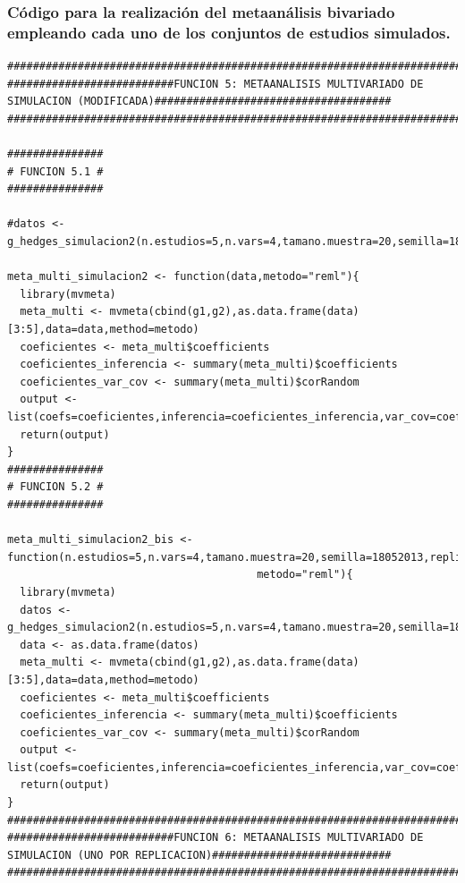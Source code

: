 \documentclass[a4paper,openright,12pt]{report}
\begin{document}
\subsubsection{Código para la realización del metaanálisis bivariado empleando cada uno de los conjuntos de estudios simulados.}
{\tiny
\begin{verbatim}
##############################################################################################################################
##########################FUNCION 5: METAANALISIS MULTIVARIADO DE SIMULACION (MODIFICADA)#####################################
##############################################################################################################################

###############
# FUNCION 5.1 #
###############

#datos <- g_hedges_simulacion2(n.estudios=5,n.vars=4,tamano.muestra=20,semilla=18052013,replicaciones=5,correlacion=0)

meta_multi_simulacion2 <- function(data,metodo="reml"){
  library(mvmeta)
  meta_multi <- mvmeta(cbind(g1,g2),as.data.frame(data)[3:5],data=data,method=metodo)
  coeficientes <- meta_multi$coefficients
  coeficientes_inferencia <- summary(meta_multi)$coefficients
  coeficientes_var_cov <- summary(meta_multi)$corRandom
  output <- list(coefs=coeficientes,inferencia=coeficientes_inferencia,var_cov=coeficientes_var_cov)
  return(output)
}
###############
# FUNCION 5.2 #
###############

meta_multi_simulacion2_bis <- function(n.estudios=5,n.vars=4,tamano.muestra=20,semilla=18052013,replicaciones=5,correlacion=0,
                                       metodo="reml"){
  library(mvmeta)
  datos <- g_hedges_simulacion2(n.estudios=5,n.vars=4,tamano.muestra=20,semilla=18052013,replicaciones=5,correlacion=0)
  data <- as.data.frame(datos)
  meta_multi <- mvmeta(cbind(g1,g2),as.data.frame(data)[3:5],data=data,method=metodo)
  coeficientes <- meta_multi$coefficients
  coeficientes_inferencia <- summary(meta_multi)$coefficients
  coeficientes_var_cov <- summary(meta_multi)$corRandom
  output <- list(coefs=coeficientes,inferencia=coeficientes_inferencia,var_cov=coeficientes_var_cov)
  return(output)  
}
##############################################################################################################################
##########################FUNCION 6: METAANALISIS MULTIVARIADO DE SIMULACION (UNO POR REPLICACION)############################
##############################################################################################################################


\end{verbatim}}
\end{document}
